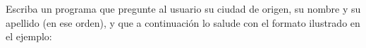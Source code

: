 \documentclass[12pt,spanish,a5paper,landscape]{article}
\begin{document}
  Escriba un programa que pregunte al usuario
  su ciudad de origen, su nombre y su apellido (en ese orden),
  y que a continuación lo salude
  con el formato ilustrado en el ejemplo:

  \begin{minipage}[t]{.5\textwidth}
    
  \end{minipage}
\end{document}
